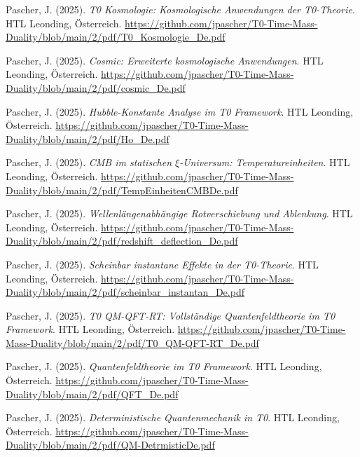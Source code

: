 \documentclass{article}
\begin{document}
\begin{thebibliography}{99}
		
		Pascher, J. (2025).
		\textit{T0 Kosmologie: Kosmologische Anwendungen der T0-Theorie}.
		HTL Leonding, Österreich.
		\url{https://github.com/jpascher/T0-Time-Mass-Duality/blob/main/2/pdf/T0_Kosmologie_De.pdf}
		
		Pascher, J. (2025).
		\textit{Cosmic: Erweiterte kosmologische Anwendungen}.
		HTL Leonding, Österreich.
		\url{https://github.com/jpascher/T0-Time-Mass-Duality/blob/main/2/pdf/cosmic_De.pdf}
		
		Pascher, J. (2025).
		\textit{Hubble-Konstante Analyse im T0 Framework}.
		HTL Leonding, Österreich.
		\url{https://github.com/jpascher/T0-Time-Mass-Duality/blob/main/2/pdf/Ho_De.pdf}
		
		Pascher, J. (2025).
		\textit{CMB im statischen $\xi$-Universum: Temperatureinheiten}.
		HTL Leonding, Österreich.
		\url{https://github.com/jpascher/T0-Time-Mass-Duality/blob/main/2/pdf/TempEinheitenCMBDe.pdf}
		
		Pascher, J. (2025).
		\textit{Wellenlängenabhängige Rotverschiebung und Ablenkung}.
		HTL Leonding, Österreich.
		\url{https://github.com/jpascher/T0-Time-Mass-Duality/blob/main/2/pdf/redshift_deflection_De.pdf}
		
		Pascher, J. (2025).
		\textit{Scheinbar instantane Effekte in der T0-Theorie}.
		HTL Leonding, Österreich.
		\url{https://github.com/jpascher/T0-Time-Mass-Duality/blob/main/2/pdf/scheinbar_instantan_De.pdf}
		
		
		Pascher, J. (2025).
		\textit{T0 QM-QFT-RT: Vollständige Quantenfeldtheorie im T0 Framework}.
		HTL Leonding, Österreich.
		\url{https://github.com/jpascher/T0-Time-Mass-Duality/blob/main/2/pdf/T0_QM-QFT-RT_De.pdf}
		
		Pascher, J. (2025).
		\textit{Quantenfeldtheorie im T0 Framework}.
		HTL Leonding, Österreich.
		\url{https://github.com/jpascher/T0-Time-Mass-Duality/blob/main/2/pdf/QFT_De.pdf}
		
		Pascher, J. (2025).
		\textit{Deterministische Quantenmechanik in T0}.
		HTL Leonding, Österreich.
		\url{https://github.com/jpascher/T0-Time-Mass-Duality/blob/main/2/pdf/QM-DetrmisticDe.pdf}
		

\end{thebibliography}
\end{document}
